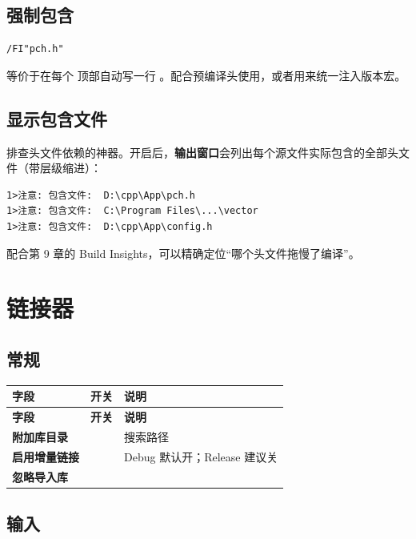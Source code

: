 {{\subsection{强制包含 }

\begin{lstlisting}[style=textstyle, breaklines=true]
/FI"pch.h"
\end{lstlisting}

等价于在每个  顶部自动写一行 。配合预编译头使用，或者用来统一注入版本宏。

\subsection{显示包含文件 }

排查头文件依赖的神器。开启后，\textbf{输出窗口}会列出每个源文件实际包含的全部头文件（带层级缩进）：

\begin{lstlisting}[style=textstyle, breaklines=true]
1>注意: 包含文件:  D:\cpp\App\pch.h
1>注意: 包含文件:  C:\Program Files\...\vector
1>注意: 包含文件:  D:\cpp\App\config.h
\end{lstlisting}

配合第 9 章的 Build Insights，可以精确定位“哪个头文件拖慢了编译”。

\section{链接器}

\subsection{常规}

\begin{longtable}{L{3.8cm}L{3.4cm}L{7.2cm}}
\toprule
\textbf{字段} & \textbf{开关} & \textbf{说明} \\
\midrule
\endfirsthead
\toprule
\textbf{字段} & \textbf{开关} & \textbf{说明} \\
\midrule
\endhead
\bottomrule
\endlastfoot
\textbf{附加库目录} &  &  搜索路径 \\
\textbf{启用增量链接} &  & Debug 默认开；Release 建议关 \\
\textbf{忽略导入库} &  & \\
\end{longtable}

\subsection{输入}

}}

